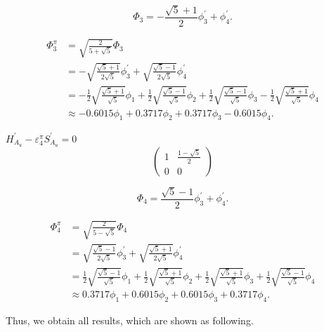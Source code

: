 \documentclass[a4paper]{book}
\newcommand{\Hp}{H^\prime}
\newcommand{\Sp}{S^\prime}
\begin{document}
\begin{solution}
\begin{enumerate}[label=(\alph*)]
		\begin{equation*}
			\Phi_3 = -\frac{\sqrt{5}+1}{2}\phi^\prime_3 + \phi^\prime_4.
		\end{equation*}
		
		
		\begin{align}
			\Phi^\pi_3 &= \sqrt{ \frac{2}{5+\sqrt{5}} } \Phi_3 \\
			&= -\sqrt{\frac{\sqrt{5}+1}{2\sqrt{5}}} \phi^\prime_3 + \sqrt{\frac{\sqrt{5}-1}{2\sqrt{5}}} \phi^\prime_4	\\
			&= -\frac{1}{2}\sqrt{\frac{\sqrt{5}+1}{\sqrt{5}}}\phi_1  + \frac{1}{2}\sqrt{\frac{\sqrt{5}-1}{\sqrt{5}}} \phi_2 + \frac{1}{2}\sqrt{\frac{\sqrt{5}-1}{\sqrt{5}}} \phi_3 - \frac{1}{2}\sqrt{\frac{\sqrt{5}+1}{\sqrt{5}}} \phi_4 \\
			&\approx -0.6015 \phi_1 + 0.3717 \phi_2 + 0.3717 \phi_3 - 0.6015 \phi_4.
		\end{align}
		
		
		$\Hp_{A_u}-\varepsilon^\pi_4 \Sp_{A_u} = 0$
		\begin{equation*}
			\begin{pmatrix}
				1	& \frac{1-\sqrt{5}}{2}	\\	0	&	0
			\end{pmatrix}
		\end{equation*}		
		
		\begin{equation*}
			\Phi_4 = \frac{\sqrt{5}-1}{2}\phi^\prime_3 + \phi^\prime_4.
		\end{equation*}
		
		
		\begin{align}
			\Phi^\pi_4 &= \sqrt{ \frac{2}{5-\sqrt{5}} } \Phi_4 \\
			&= \sqrt{\frac{\sqrt{5}-1}{2\sqrt{5}}} \phi^\prime_3 + \sqrt{\frac{\sqrt{5}+1}{2\sqrt{5}}} \phi^\prime_4	\\
			&= \frac{1}{2}\sqrt{\frac{\sqrt{5}-1}{\sqrt{5}}}\phi_1  + \frac{1}{2}\sqrt{\frac{\sqrt{5}+1}{\sqrt{5}}} \phi_2 + \frac{1}{2}\sqrt{\frac{\sqrt{5}+1}{\sqrt{5}}} \phi_3 + \frac{1}{2}\sqrt{\frac{\sqrt{5}-1}{\sqrt{5}}} \phi_4 \\
			&\approx 0.3717 \phi_1 + 0.6015 \phi_2 + 0.6015 \phi_3 + 0.3717 \phi_4.
		\end{align}
		
		Thus, we obtain all results, which are shown as following.
		

\end{enumerate}
\end{solution}
\end{document}
